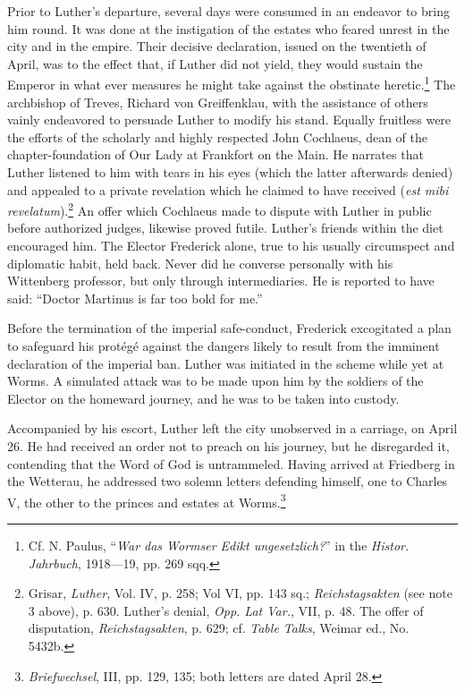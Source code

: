 Prior to Luther’s departure, several days were consumed in an
endeavor to bring him round. It was done at the instigation of the
estates who feared unrest in the city and in the empire. Their decisive
declaration, issued on the twentieth of April, was to the effect that,
if Luther did not yield, they would sustain the Emperor in what
ever measures he might take against the obstinate heretic.\footnote
{Cf. N. Paulus, “\textit{War das Wormser Edikt ungesetzlich?}” in the \textit{Histor. Jahrbuch},
1918—19, pp. 269 sqq.}
The archbishop of Treves, Richard von Greiffenklau, with the assistance
of others vainly endeavored to persuade Luther to modify his stand.
Equally fruitless were the efforts of the scholarly and highly respected
John Cochlaeus, dean of the chapter-foundation of Our Lady at
Frankfort on the Main. He narrates that Luther listened to him
with tears in his eyes (which the latter afterwards denied) and
appealed to a private revelation which he claimed to have received
(\textit{est mibi revelatum}).\footnote
{Grisar, \textit{Luther}, Vol. IV, p. 258; Vol VI, pp. 143 sq.; \textit{Reichstagsakten} (see note 3
above), p. 630. Luther’s denial, \textit{Opp. Lat Var.}, VII, p. 48. The offer of disputation, \textit{Reichstagsakten},
p. 629; cf. \textit{Table Talks}, Weimar ed., No. 5432b.}
An offer which Cochlaeus made to dispute
with Luther in public before authorized judges, likewise proved
futile. Luther’s friends within the diet encouraged him. The Elector
Frederick alone, true to his usually circumspect and diplomatic habit,
held back. Never did he converse personally with his Wittenberg
professor, but only through intermediaries. He is reported to have
said: “Doctor Martinus is far too bold for me.”

Before the termination of the imperial safe-conduct, Frederick
excogitated a plan to safeguard his protégé against the dangers likely
to result from the imminent declaration of the imperial ban. Luther
was initiated in the scheme while yet at Worms. A simulated attack
was to be made upon him by the soldiers of the Elector on the homeward
journey, and he was to be taken into custody.

Accompanied by his escort, Luther left the city unobserved in
a carriage, on April 26. He had received an order not to preach on
his journey, but he disregarded it, contending that the Word of
God is untrammeled. Having arrived at Friedberg in the Wetterau,
he addressed two solemn letters defending himself, one to Charles
V, the other to the princes and estates at Worms.\footnote{\textit{Briefwechsel}, III, pp. 129, 135; both letters are dated April 28.}


